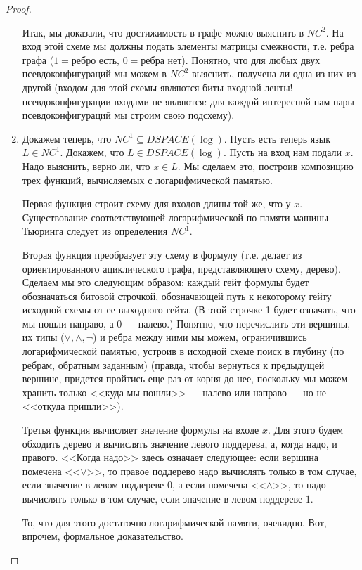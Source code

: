 \begin{proof}
\begin{enumerate}
	Итак, мы доказали, что достижимость в графе можно выяснить в $NC^2$.
	На вход этой схеме мы должны подать элементы матрицы смежности,
	т.е. ребра графа ($1=\textrm{ребро есть}$, $0=\textrm{ребра нет}$).
	Понятно, что для любых двух псевдоконфигураций мы можем в $NC^2$ выяснить,
	получена ли одна из них из другой (входом для этой схемы являются
	биты входной ленты! псевдоконфигурации входами не являются: для каждой
	интересной нам пары псевдоконфигураций мы строим свою подсхему).

	\item Докажем теперь, что $NC^1 \subseteq DSPACE(\log)$. 
	Пусть есть теперь язык $L \in NC^1$. Докажем, что $L\in DSPACE(\log)$. 
	Пусть на вход нам подали $x$. Надо выяснить, верно ли, что
	$x\in L$. Мы сделаем это, построив композицию трех функций, вычисляемых
	с логарифмической памятью.

	Первая функция строит схему для входов длины той же, что у $x$.
	Существование соответствующей логарифмической по памяти машины Тьюринга
	следует из определения $NC^1$.

	Вторая функция преобразует эту схему в формулу
	(т.е. делает из ориентированного ациклического графа, 
	представляющего схему, дерево). Сделаем
	мы это следующим образом: каждый гейт формулы будет 
	обозначаться битовой строчкой, обозначающей путь к некоторому гейту
	исходной схемы от ее выходного гейта.
	(В этой строчке 1 будет означать, что мы пошли направо, а 0 --- налево.)
	Понятно, что перечислить эти вершины, их типы ($\lor, \land, \lnot$) 
	и ребра между ними мы можем, ограничившись логарифмической памятью,
	устроив в исходной схеме поиск в глубину (по ребрам, обратным заданным)
	(правда, чтобы вернуться к предыдущей вершине, придется пройтись еще
	раз от корня до нее, поскольку мы можем хранить только <<куда мы пошли>> ---
	налево или направо --- но не <<откуда пришли>>).

	Третья функция вычисляет значение формулы на входе $x$. 
	Для этого будем обходить дерево и вычислять значение левого поддерева,
	а, когда надо, и правого. <<Когда надо>> здесь означает
	следующее: если вершина помечена <<$\lor$>>, 
	то правое поддерево надо вычислять только в том случае, если значение в левом 
	поддереве $0$, а если помечена <<$\land$>>, то надо вычислять 
	только в том случае, если значение в левом поддереве $1$. 

	То, что для этого достаточно логарифмической памяти, очевидно.
	Вот, впрочем, формальное доказательство.


\end{enumerate}
\end{proof}
